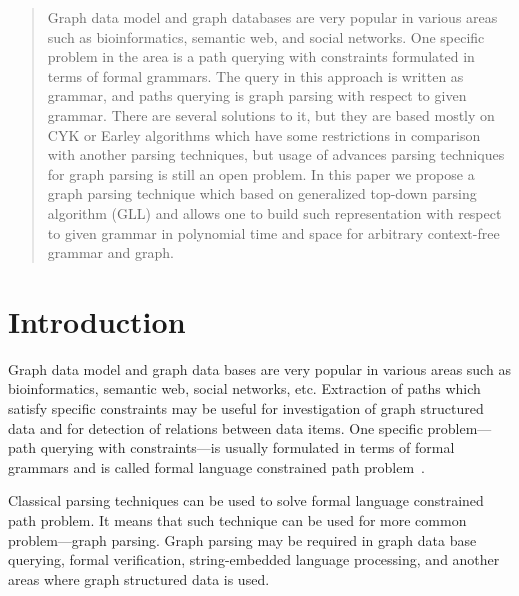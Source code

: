 \documentclass[runningheads,a4paper]{llncs}
\begin{document}
\begin{abstract}
Graph data model and graph databases are very popular in various areas such as bioinformatics, semantic web, and social networks.
One specific problem in the area is a path querying with constraints formulated in terms of formal grammars.
The query in this approach is written as grammar, and paths querying is graph parsing with respect to given grammar.
There are several solutions to it, but they are based mostly on CYK or Earley algorithms which have some restrictions in comparison with another parsing techniques, but usage of advances parsing techniques for graph parsing is still an open problem.
In this paper we propose a graph parsing technique which based on generalized top-down parsing algorithm (GLL) and allows one to build such representation with respect to given grammar in polynomial time and space for arbitrary context-free grammar and graph.


\end{abstract}






\section{Introduction}
Graph data model and graph data bases are very popular in various areas such as bioinformatics, semantic web, social networks, etc.
Extraction of paths which satisfy specific constraints may be useful for investigation of graph structured data and for detection of relations between data items.
One specific problem---path querying with constraints---is usually formulated in terms of formal grammars and is called formal language constrained path problem~\cite{FLCpathProblem}.

Classical parsing techniques can be used to solve formal language constrained path problem.
It means that such technique can be used for more common problem---graph parsing. 
Graph parsing may be required in graph data base querying, formal verification, string-embedded language processing, and another areas where graph structured data is used. 
\end{document}
